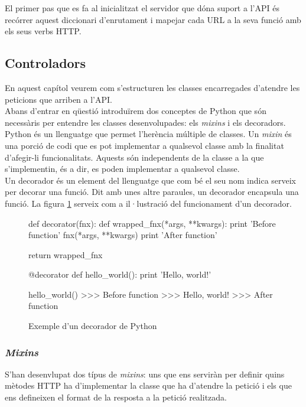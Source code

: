 El primer pas que es fa al inicialitzat el servidor que dóna suport a l'\ac{API} és recórrer aquest diccionari d'enrutament i mapejar cada \ac{URL} a la seva funció amb els seus verbs \ac{HTTP}.

\subsection{Controladors}

En aquest capítol veurem com s'estructuren les classes encarregades d'atendre les peticions que arriben a l'\ac{API}. \\

Abans d'entrar en qüestió introduïrem dos conceptes de Python que són necessàris per entendre les classes desenvolupades: els \emph{mixins} i els decoradors.\\

Python és un llenguatge que permet l'herència múltiple de classes. Un \emph{mixin} és una porció de codi que es pot implementar a qualsevol classe amb la finalitat d'afegir-li funcionalitats. Aquests són independents de la classe a la que s'implementin, és a dir, es poden implementar a qualsevol classe.\\

Un decorador és un element del llenguatge que com bé el seu nom indica serveix per decorar una funció. Dit amb unes altre paraules, un decorador encapsula una funció. La figura \ref{fig:decorator} serveix com a il·lustració del funcionament d'un decorador.

\begin{figure}[h!]
	\begin{python}
def decorator(fnx):
	def wrapped_fnx(*args, **kwargs):
		print 'Before function'
		fnx(*args, **kwargs)
		print 'After function'

	return wrapped_fnx

@decorator
def hello_world():
	print 'Hello, world!'

hello_world()
>>> Before function
>>> Hello, world!
>>> After function
	\end{python}
	\caption{Exemple d'un decorador de Python}
	\label{fig:decorator}
\end{figure}

\subsubsection{\emph{Mixins}}

S'han desenvlupat dos típus de \emph{mixins}: uns que ens serviràn per definir quins mètodes \ac{HTTP} ha d'implementar la classe que ha d'atendre la petició i els que ens defineixen el format de la resposta a la petició realitzada.\\

